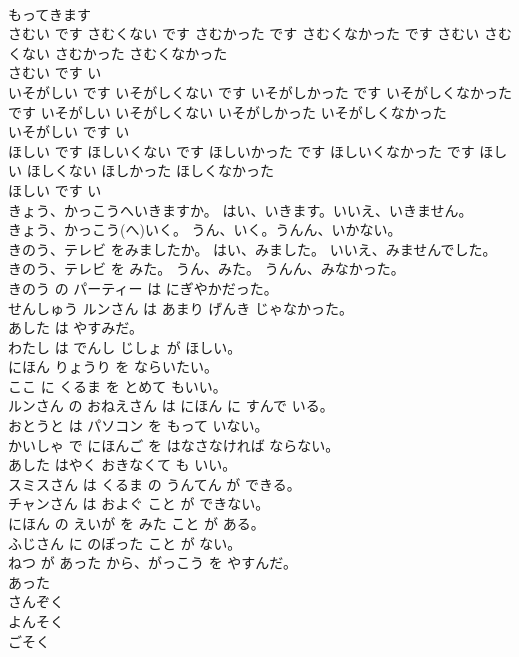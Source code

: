\documentclass[8pt]{extreport}
\begin{document}
\begin{CJK}{UTF8}{min}
\\	もってきます	
\\	さむい です さむくない です さむかった です さむくなかった です	さむい さむくない さむかった さむくなかった	
\\	さむい です	い 
\\	いそがしい です いそがしくない です いそがしかった です いそがしくなかった です	いそがしい いそがしくない いそがしかった いそがしくなかった	
\\	いそがしい です	い 
\\	ほしい です ほしいくない です ほしいかった です ほしいくなかった です	ほしい ほしくない ほしかった ほしくなかった	
\\	ほしい です	い 
\\	きょう、かっこうへいきますか。 はい、いきます。いいえ、いきません。
\\	きょう、かっこう(へ)いく。 うん、いく。うんん、いかない。 
\\	きのう、テレビ をみましたか。 はい、みました。 いいえ、みませんでした。 
\\	きのう、テレビ を みた。 うん、みた。 うんん、みなかった。 
\\	きのう の パーティー は にぎやかだった。	
\\	せんしゅう ルンさん は あまり げんき じゃなかった。	
\\	あした は やすみだ。	
\\	わたし は でんし じしょ が ほしい。	
\\	にほん りょうり を ならいたい。	
\\	ここ に くるま を とめて もいい。	
\\	ルンさん の おねえさん は にほん に すんで いる。	
\\	おとうと は パソコン を もって いない。	
\\	かいしゃ で にほんご を はなさなければ ならない。	
\\	あした はやく おきなくて も いい。	
\\	スミスさん は くるま の うんてん が できる。	
\\	チャンさん は およぐ こと が できない。
\\	にほん の えいが を みた こと が ある。	
\\	ふじさん に のぼった こと が ない。	
\\	ねつ が あった から、がっこう を やすんだ。	
\\	あった 
\\	さんぞく	
\\	よんそく	
\\	ごそく	

\end{CJK}
\end{document}
